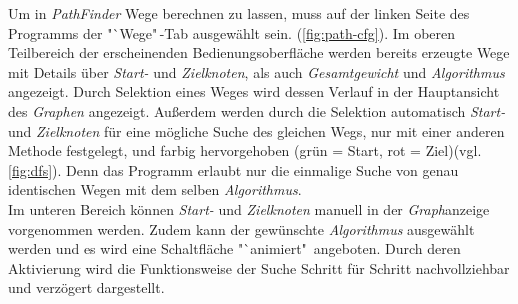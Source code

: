 \documentclass[12pt]{article}
\begin{document}
Um in \textit{PathFinder} Wege berechnen zu lassen, muss auf der linken Seite des Programms der "`Wege"\,-Tab ausgewählt sein. (\autoref{fig:path-cfg}). Im oberen Teilbereich der erscheinenden Bedienungsoberfläche werden bereits erzeugte Wege mit Details über \textit{Start-} und \textit{Zielknoten}, als auch \textit{Gesamtgewicht} und \textit{Algorithmus} angezeigt. Durch Selektion eines Weges wird dessen Verlauf in der Hauptansicht des \textit{Graphen} angezeigt. Außerdem werden durch die Selektion automatisch \textit{Start-} und \textit{Zielknoten} für eine mögliche Suche des gleichen Wegs, nur mit einer anderen Methode festgelegt, und farbig hervorgehoben (grün = Start, rot = Ziel)(vgl. \autoref{fig:dfs}). Denn das Programm erlaubt nur die einmalige Suche von genau identischen Wegen mit dem selben \textit{Algorithmus}.
\\
Im unteren Bereich können \textit{Start-} und \textit{Zielknoten} manuell in der \textit{Graph}anzeige vorgenommen werden. Zudem kann der gewünschte \textit{Algorithmus} ausgewählt werden und es wird eine Schaltfläche "`animiert"\ angeboten. Durch deren Aktivierung wird die Funktionsweise der Suche Schritt für Schritt nachvollziehbar und verzögert dargestellt.
\end{document}
